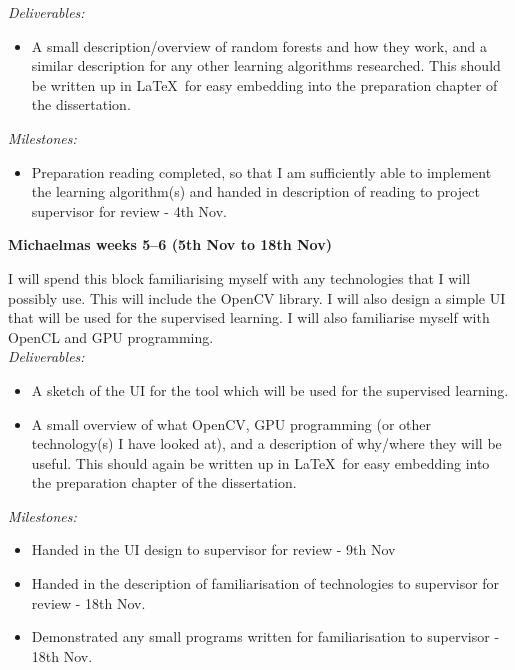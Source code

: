 {\em Deliverables:} 
\begin{itemize} 
    \item 
    A small description/overview of random forests and how they work, and a 
    similar description for any other learning algorithms researched. This 
    should be written up in \LaTeX\ for easy embedding into the preparation 
    chapter of the dissertation.
\end{itemize}

{\em Milestones:}
\begin{itemize}
    \item 
    Preparation reading completed, so that I am sufficiently able to implement 
    the learning algorithm(s) and handed in description of reading to project 
    supervisor for review - 4th Nov.
\end{itemize}



{\bf Michaelmas weeks 5--6 (5th Nov to 18th Nov)} 

I will spend this block familiarising myself with any technologies that I will 
possibly use. This will include the OpenCV library. I will also 
design a simple UI that will be used for the supervised learning. I will also 
familiarise myself with OpenCL and GPU programming. \\

{\em Deliverables:} 
\begin{itemize} 
    \item 
    A sketch of the UI for the tool which will be used for the supervised 
    learning.
    \item 
    A small overview of what OpenCV, GPU programming (or other technology(s) I 
    have looked at), and a description of why/where they will be useful. This 
    should again be written up in \LaTeX\ for easy embedding into the 
    preparation chapter of the dissertation.
\end{itemize}

{\em Milestones:}
\begin{itemize}
    \item 
    Handed in the UI design to supervisor for review - 9th Nov
    \item 
    Handed in the description of familiarisation of technologies to supervisor 
    for review - 18th Nov.
    \item 
    Demonstrated any small programs written for familiarisation to supervisor - 
    18th Nov.
\end{itemize}




